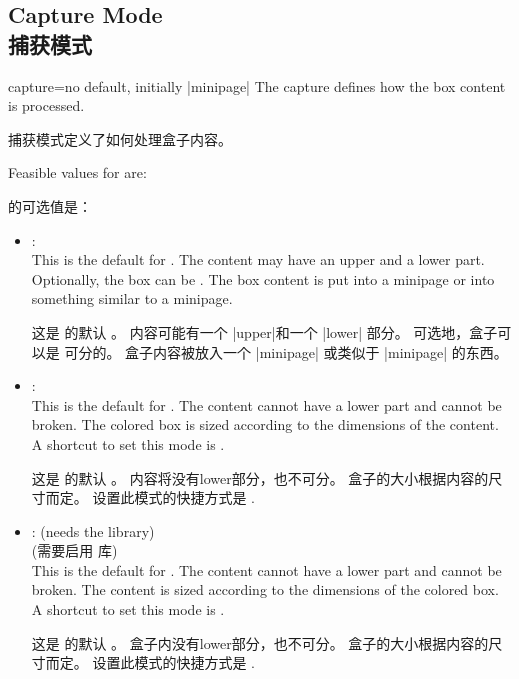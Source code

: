 \setcounter{section}{4}
\setcounter{subsection}{16}
\setcounter{subsubsection}{0}

\subsection{Capture Mode\\捕获模式}\label{subsec:capture}
\begin{docTcbKey}{capture}{=}{no default, initially |minipage|}
The capture  defines how the box content is processed.

捕获模式定义了如何处理盒子内容。

Feasible values for  are:

 的可选值是：
\begin{itemize}
\item{}:\\
  This is the default  for .
  The content may have an upper and a lower part. 
  Optionally, the box
  can be . The box content is put into a
  minipage or into something similar to a minipage.

这是  的默认  。%
内容可能有一个 |upper|和一个 |lower| 部分。%
可选地，盒子可以是  可分的。
盒子内容被放入一个 |minipage| 或类似于 |minipage| 的东西。
\item{}:\\
  This is the default  for . The content cannot have
  a lower part and cannot be broken. The colored box is sized according
  to the dimensions of the content.
  A shortcut to set this mode is .

这是  的默认  。%
内容将没有lower部分，也不可分。%
盒子的大小根据内容的尺寸而定。%
设置此模式的快捷方式是 .
\item{}:%
 (needs the  library)\\

 (需要启用  库)\\
 
 This is the default  for . The content cannot have
  a lower part and cannot be broken.
  The content is sized according to the dimensions of the colored box.
  A shortcut to set this mode is .

这是  的默认 。 %
盒子内没有lower部分，也不可分。
盒子的大小根据内容的尺寸而定。%
设置此模式的快捷方式是 .
\end{itemize}


\end{docTcbKey}
